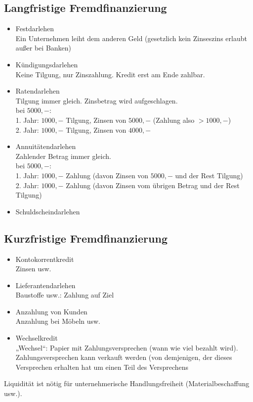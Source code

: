 \subsection{Langfristige Fremdfinanzierung}
\begin{itemize}
\item Festdarlehen\\
Ein Unternehmen leiht dem anderen Geld (gesetzlich kein Zinseszins erlaubt außer bei Banken)
\item Kündigungsdarlehen\\
Keine Tilgung, nur Zinszahlung. Kredit erst am Ende zahlbar.
\item Ratendarlehen\\
Tilgung immer gleich. Zinsbetrag wird aufgeschlagen.\\
bei $5000,-$:\\
1. Jahr: $1000,-$ Tilgung, Zinsen von $5000,-$ (Zahlung also $>1000,-$)\\
2. Jahr: $1000,-$ Tilgung, Zinsen von $4000,-$
\item Annuitätendarlehen\\
Zahlender Betrag immer gleich.\\
bei $5000,-$:\\
1. Jahr: $1000,-$ Zahlung (davon Zinsen von $5000,-$ und der Rest Tilgung)\\
2. Jahr: $1000,-$ Zahlung (davon Zinsen vom übrigen Betrag und der Rest Tilgung)
\item Schuldscheindarlehen
\end{itemize}

\subsection{Kurzfristige Fremdfinanzierung}
\begin{itemize}
\item Kontokorrentkredit\\
Zinsen usw.
\item Lieferantendarlehen\\
Baustoffe usw.: Zahlung auf Ziel
\item Anzahlung von Kunden\\
Anzahlung bei Möbeln usw.
\item Wechselkredit\\
„Wechsel“: Papier mit Zahlungsversprechen (wann wie viel bezahlt wird). Zahlungsversprechen kann verkauft werden (von demjenigen, der dieses Versprechen erhalten hat um einen Teil des Versprechens
\end{itemize}
Liquidität ist nötig für unternehmerische Handlungsfreiheit (Materialbeschaffung usw.).

